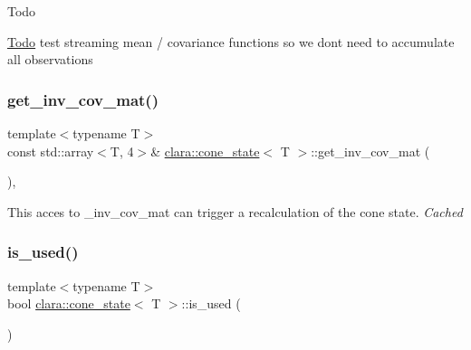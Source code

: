 \begin{DoxyRefDesc}{Todo}
\item[\hyperlink{todo__todo000004}{Todo}]test streaming mean / covariance functions so we don\textquotesingle{}t need to accumulate all observations \end{DoxyRefDesc}
\mbox{\label{classclara_1_1cone__state_a7a0584b86ba125a2c232f26d4d1e4a38}} 
\subsubsection{\texorpdfstring{get\+\_\+inv\+\_\+cov\+\_\+mat()}{get\_inv\_cov\_mat()}}
{\footnotesize\ttfamily template$<$typename T$>$ \\
const std\+::array$<$T, 4$>$\& \hyperlink{classclara_1_1cone__state}{clara\+::cone\+\_\+state}$<$ T $>$\+::get\+\_\+inv\+\_\+cov\+\_\+mat (\begin{DoxyParamCaption}{ }\end{DoxyParamCaption})\hspace{0.3cm}{\ttfamily [inline]}, {\ttfamily [private]}}



This acces to {\ttfamily \+\_\+inv\+\_\+cov\+\_\+mat} can trigger a recalculation of the cone state. {\itshape Cached} 

\mbox{\label{classclara_1_1cone__state_ae3ea1ca7a6af262f71493f45c0734322}} 
\subsubsection{\texorpdfstring{is\+\_\+used()}{is\_used()}}
{\footnotesize\ttfamily template$<$typename T$>$ \\
bool \hyperlink{classclara_1_1cone__state}{clara\+::cone\+\_\+state}$<$ T $>$\+::is\+\_\+used (\begin{DoxyParamCaption}{ }\end{DoxyParamCaption})\hspace{0.3cm}{\ttfamily [inline]}}

